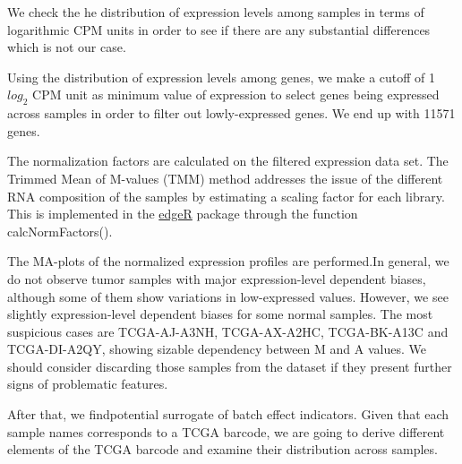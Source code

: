 \documentclass[9pt,twocolumn,twoside]{gsajnl}
\begin{document}
We check the he distribution of expression levels among samples in terms of logarithmic CPM units in order to see if there are any substantial differences which is not our case.

Using the distribution of expression levels among genes, we make a cutoff of 1 $log_{2}$ CPM unit as minimum value of expression to select genes being expressed across samples in order to filter out lowly-expressed genes. We end up with 11571 genes.


The normalization factors are calculated on the filtered expression data set. The Trimmed Mean of M-values (TMM) method addresses the issue of the different RNA composition of the samples by estimating a scaling factor for each library. This is implemented in the \href{http://bioconductor.org/packages/release/bioc/html/edgeR.html}{edgeR} package through the function calcNormFactors().

The MA-plots of the normalized expression profiles are performed.In general, we do not observe tumor samples with major expression-level dependent biases, although some of them show variations in low-expressed values. However, we see slightly expression-level dependent biases for some normal samples. The most suspicious cases are TCGA-AJ-A3NH, TCGA-AX-A2HC, TCGA-BK-A13C and TCGA-DI-A2QY, showing sizable dependency between M and A values. We should consider discarding those samples from the dataset if they present further signs of problematic features.


After that, we findpotential surrogate of batch effect indicators. Given that each sample names corresponds to a TCGA barcode, we are going to derive different elements of the TCGA barcode and examine their distribution across samples.

\end{document}
